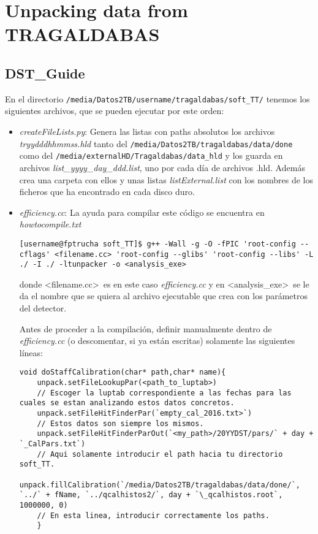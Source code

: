 
\chapter{Unpacking data from TRAGALDABAS}

\section{DST\_Guide}

En el directorio \texttt{/media/Datos2TB/username/tragaldabas/soft\_TT/} tenemos los siguientes archivos, que se pueden ejecutar por este orden:

\begin{itemize}
	\item \textit{createFileLists.py}: Genera las listas con paths absolutos los archivos \textit{tryydddhhmmss.hld} tanto del \texttt{/media/Datos2TB/tragaldabas/data/done} como del \texttt{/media/externalHD/Tragaldabas/data\_hld} y los guarda en archivos \textit{list\_yyyy\_day\_ddd.list}, uno por cada día de archivos .hld. Además crea una carpeta con ellos y unas listas \textit{listExternal.list} con los nombres de los ficheros que ha encontrado en cada disco duro.
	
	\item \textit{efficiency.cc}: La ayuda para compilar este código se encuentra en \textit{howtocompile.txt}
	
	\begin{lstlisting}[style=customsh]
[username@fptrucha soft_TT]$ g++ -Wall -g -O -fPIC 'root-config --cflags' <filename.cc> 'root-config --glibs' 'root-config --libs' -L ./ -I ./ -ltunpacker -o <analysis_exe>
	\end{lstlisting}
	donde \textless filename.cc\textgreater\ es en este caso \textit{efficiency.cc} y en \textless analysis\_exe\textgreater\ se le da el nombre que se quiera al archivo ejecutable que crea con los parámetros del detector.
	
	Antes de proceder a la compilación, definir manualmente dentro de \textit{efficiency.cc} (o descomentar, si ya están escritas) solamente las siguientes líneas:
	
	\begin{lstlisting}[style=customc]
void doStaffCalibration(char* path,char* name){
	unpack.setFileLookupPar(<path_to_luptab>)
	// Escoger la luptab correspondiente a las fechas para las cuales se estan analizando estos datos concretos.
	unpack.setFileHitFinderPar(`empty_cal_2016.txt>`)
	// Estos datos son siempre los mismos.
	unpack.setFileHitFinderParOut(`<my_path>/20YYDST/pars/` + day + `_CalPars.txt`)
	// Aqui solamente introducir el path hacia tu directorio soft_TT.
	unpack.fillCalibration(`/media/Datos2TB/tragaldabas/data/done/`, `../` + fName, `../qcalhistos2/`, day + `\_qcalhistos.root`, 1000000, 0)
	// En esta linea, introducir correctamente los paths.
	}
	

\end{lstlisting}
\end{itemize}
